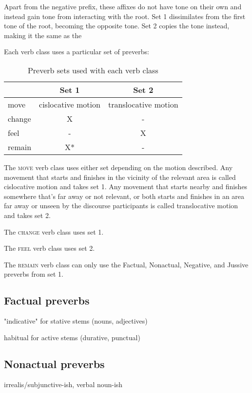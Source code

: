 \documentclass[smallroyalvopaper,9pt]{memoir}
\begin{document}
Apart from the negative prefix, these affixes do not have tone on their own and instead gain tone from interacting with the root. Set 1 dissimilates from the first tone of the root, becoming the opposite tone. Set 2 copies the tone instead, making it the same as the 

Each verb class uses a particular set of preverbs:

\begin{table}[ht]
    \centering
    \begin{tabular}{>{\sc}lcc}
        \toprule
        & Set 1 & Set 2 \\
        \midrule
        move & cislocative motion & translocative motion \\
        change & X & - \\
        feel & - & X \\
        remain & X* & -\\
        \bottomrule
    \end{tabular}
    \caption{Preverb sets used with each verb class}
\end{table}

The \textsc{move} verb class uses either set depending on the motion described. Any movement that starts and finishes in the vicinity of the relevant area is called cislocative motion and takes set 1. Any movement that starts nearby and finishes somewhere that's far away or not relevant, or both starts and finishes in an area far away or unseen by the discourse participants is called translocative motion and takes set 2.

The \textsc{change} verb class uses set 1.

The \textsc{feel} verb class uses set 2.

The \textsc{remain} verb class can only use the Factual, Nonactual, Negative, and Jussive preverbs from set 1.

\subsection{Factual preverbs}

"indicative" for stative stems (nouns, adjectives)

habitual for active stems (durative, punctual)

\subsection{Nonactual preverbs}

irrealis/subjunctive-ish, verbal noun-ish
\end{document}
